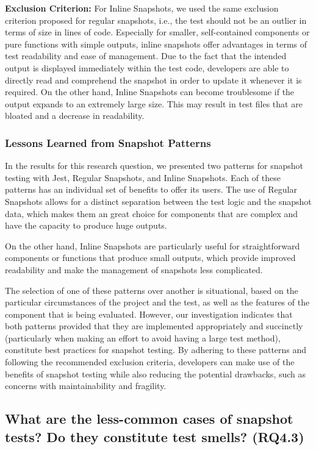 \documentclass[
	msc, %
	english %
]{../ppgccufmg}
\begin{document}
        \noindent\textbf{Exclusion Criterion:} For Inline Snapshots, we used the same exclusion criterion proposed for regular snapshots, i.e., the test should not be an outlier in terms of size in lines of code. Especially for smaller, self-contained components or pure functions with simple outputs, inline snapshots offer advantages in terms of test readability and ease of management. Due to the fact that the intended output is displayed immediately within the test code, developers are able to directly read and comprehend the snapshot in order to update it whenever it is required. On the other hand, Inline Snapshots can become troublesome if the output expands to an extremely large size. This may result in test files that are bloated and a decrease in readability.

        \subsubsection{Lessons Learned from Snapshot Patterns} 
        
        In the results for this research question, we presented two patterns for snapshot testing with Jest, Regular Snapshots, and Inline Snapshots. Each of these patterns has an individual set of benefits to offer its users. The use of Regular Snapshots allows for a distinct separation between the test logic and the snapshot data, which makes them an great choice for components that are complex and have the capacity to produce huge outputs.
        
        On the other hand, Inline Snapshots are particularly useful for straightforward components or functions that produce small outputs, which provide improved readability and make the management of snapshots less complicated.
        
        The selection of one of these patterns over another is situational, based on the particular circumstances of the project and the test, as well as the features of the component that is being evaluated. However, our investigation indicates that both patterns provided that they are implemented appropriately and succinctly (particularly when making an effort to avoid having a large test method), constitute best practices for snapshot testing. By adhering to these patterns and following the recommended exclusion criteria, developers can make use of the benefits of snapshot testing while also reducing the potential drawbacks, such as concerns with maintainability and fragility.

        \subsection{What are the less-common cases of snapshot tests? Do they constitute test smells? (RQ4.3)}
\end{document}
